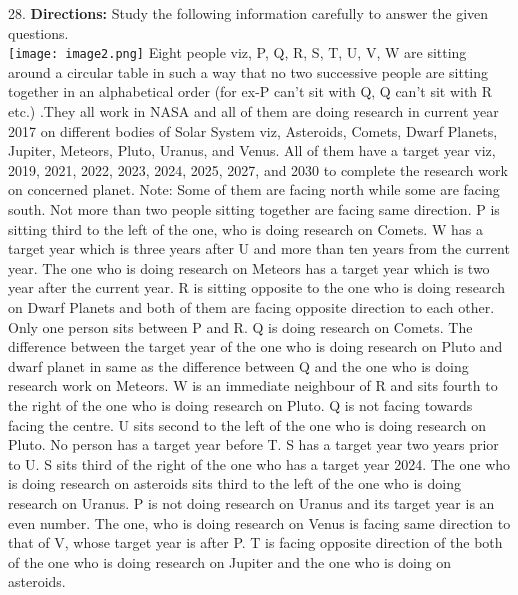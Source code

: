 \documentclass[
]{article}
\begin{document}
28. \textbf{Directions:} Study the following information carefully to answer the given questions.\\
\texttt{[image: image2.png]}
Eight people viz, P, Q, R, S, T, U, V, W are sitting around a circular table in such a way that no two
successive people are sitting together in an alphabetical order (for ex-P can’t sit with Q, Q
can’t sit with R etc.) .They all work in NASA and all of them are doing research in current
year 2017 on different bodies of Solar System viz, Asteroids, Comets, Dwarf Planets, Jupiter,
Meteors, Pluto, Uranus, and Venus. All of them have a target year viz, 2019, 2021, 2022,
2023, 2024, 2025, 2027, and 2030 to complete the research work on concerned planet. Note:
Some of them are facing north while some are facing south. Not more than two people
sitting together are facing same direction. P is sitting third to the left of the one, who is
doing research on Comets. W has a target year which is three years after U and more than
ten years from the current year. The one who is doing research on Meteors has a target year
which is two year after the current year. R is sitting opposite to the one who is doing
research on Dwarf Planets and both of them are facing opposite direction to each other.
Only one person sits between P and R. Q is doing research on Comets. The difference
between the target year of the one who is doing research on Pluto and dwarf planet in same
as the difference between Q and the one who is doing research work on Meteors. W is an
immediate neighbour of R and sits fourth to the right of the one who is doing research on
Pluto. Q is not facing towards facing the centre. U sits second to the left of the one who is
doing research on Pluto. No person has a target year before T. S has a target year two years
prior to U. S sits third of the right of the one who has a target year 2024. The one who is
doing research on asteroids sits third to the left of the one who is doing research on Uranus.
P is not doing research on Uranus and its target year is an even number. The one, who is
doing research on Venus is facing same direction to that of V, whose target year is after P. T
is facing opposite direction of the both of the one who is doing research on Jupiter and the
one who is doing on asteroids.\\
\end{document}

